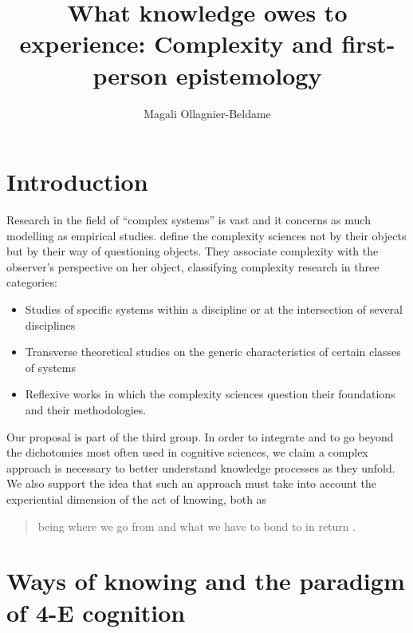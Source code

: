 \documentclass[output=paper]{langscibook}
\author{Magali Ollagnier-Beldame\affiliation{UMR 5161 ICAR; Centre National de la Recherche Scientifique; Ecole Normale Supérieure; Université Lumière Lyon 2}}
\title[What knowledge owes to experience]
      {What knowledge owes to experience: Complexity and first-person epistemology}
\begin{document}
\maketitle 

\section{Introduction}

Research in the field of “complex systems” is vast and it concerns as much modelling as empirical studies. \citet{BertinEtAl2011} define the complexity sciences not by their objects but by their way of questioning objects. They associate complexity with the observer’s perspective on her object, classifying complexity research in three categories: 

\begin{itemize}\sloppy
\item Studies of specific systems within a discipline or at the intersection of several disciplines
\item Transverse theoretical studies on the generic characteristics of certain classes of systems
\item Reflexive works in which the complexity sciences question their foundations and their methodologies. 
\end{itemize}

Our proposal is part of the third group. In order to integrate and to go beyond the dichotomies most often used in cognitive sciences, we claim a complex approach is necessary to better understand knowledge processes as they unfold. We also support the idea that such an approach must take into account the experiential dimension of the act of knowing, both as 

\begin{quote}
being where we go from and what we have to bond to in return \citep[26]{Varela2017}.
\end{quote}

\section{Ways of knowing and the paradigm of 4-E cognition}
\end{document}
